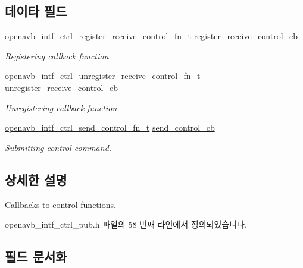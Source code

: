 \subsection*{데이타 필드}
\begin{DoxyCompactItemize}
\item 
\hyperlink{intf__ctrl_2openavb__intf__ctrl__pub_8h_a9a739564515de21f0382901870c16853}{openavb\+\_\+intf\+\_\+ctrl\+\_\+register\+\_\+receive\+\_\+control\+\_\+fn\+\_\+t} \hyperlink{structopenavb__intf__host__cb__list__t_a5ccfdb0b676dc8830eac1eeca44a7f28}{register\+\_\+receive\+\_\+control\+\_\+cb}
\begin{DoxyCompactList}\small\item\em Registering callback function. \end{DoxyCompactList}\item 
\hyperlink{intf__ctrl_2openavb__intf__ctrl__pub_8h_abf2b285b88665dd03cfd12256b236f4c}{openavb\+\_\+intf\+\_\+ctrl\+\_\+unregister\+\_\+receive\+\_\+control\+\_\+fn\+\_\+t} \hyperlink{structopenavb__intf__host__cb__list__t_a8ce2284ca4be905c7a121b776ba55ee6}{unregister\+\_\+receive\+\_\+control\+\_\+cb}
\begin{DoxyCompactList}\small\item\em Unregistering callback function. \end{DoxyCompactList}\item 
\hyperlink{intf__ctrl_2openavb__intf__ctrl__pub_8h_a6bd040f56d93e7bce1de0caa4359b6b9}{openavb\+\_\+intf\+\_\+ctrl\+\_\+send\+\_\+control\+\_\+fn\+\_\+t} \hyperlink{structopenavb__intf__host__cb__list__t_ac7b9a241fc9b4f279a63afa7b481c2aa}{send\+\_\+control\+\_\+cb}
\begin{DoxyCompactList}\small\item\em Submitting control command. \end{DoxyCompactList}\end{DoxyCompactItemize}


\subsection{상세한 설명}
Callbacks to control functions. 

openavb\+\_\+intf\+\_\+ctrl\+\_\+pub.\+h 파일의 58 번째 라인에서 정의되었습니다.



\subsection{필드 문서화}
